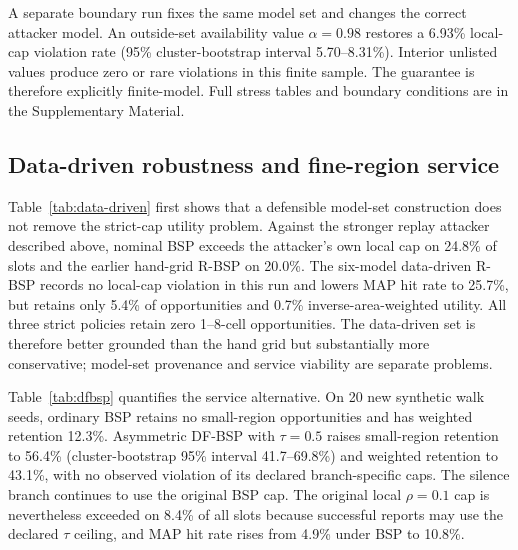 \documentclass[review,11pt,times]{elsarticle}
\begin{document}
A separate boundary run fixes the same model set and changes the correct attacker model. An outside-set availability value \(\alpha=0.98\) restores a 6.93\% local-cap violation rate (95\% cluster-bootstrap interval 5.70--8.31\%). Interior unlisted values produce zero or rare violations in this finite sample. The guarantee is therefore explicitly finite-model. Full stress tables and boundary conditions are in the Supplementary Material.

\subsection{Data-driven robustness and fine-region service}
\label{sec:data-driven-results}
Table~\ref{tab:data-driven} first shows that a defensible model-set construction does not remove the strict-cap utility problem. Against the stronger replay attacker described above, nominal BSP exceeds the attacker's own local cap on 24.8\% of slots and the earlier hand-grid R-BSP on 20.0\%. The six-model data-driven R-BSP records no local-cap violation in this run and lowers MAP hit rate to 25.7\%, but retains only 5.4\% of opportunities and 0.7\% inverse-area-weighted utility. All three strict policies retain zero 1--8-cell opportunities. The data-driven set is therefore better grounded than the hand grid but substantially more conservative; model-set provenance and service viability are separate problems.

\begin{table}[tbp]
\centering
\caption{Post-hoc GeoLife data-driven robustness at $\rho=0.1$. The replay attacker uses the development-only smoothed population prior and validation point mobility estimate. ``Local viol.'' tests the attacker's pre-output local cap. Weighted retention is Eq.~\eqref{eq:weighted-utility}; small retention covers 1--8-cell opportunities.}
\label{tab:data-driven}{\scriptsize\setlength{\tabcolsep}{3pt}}
\end{table}

Table~\ref{tab:dfbsp} quantifies the service alternative. On 20 new synthetic walk seeds, ordinary BSP retains no small-region opportunities and has weighted retention 12.3\%. Asymmetric DF-BSP with $\tau=0.5$ raises small-region retention to 56.4\% (cluster-bootstrap 95\% interval 41.7--69.8\%) and weighted retention to 43.1\%, with no observed violation of its declared branch-specific caps. The silence branch continues to use the original BSP cap. The original local $\rho=0.1$ cap is nevertheless exceeded on 8.4\% of all slots because successful reports may use the declared $\tau$ ceiling, and MAP hit rate rises from 4.9\% under BSP to 10.8\%.
\end{document}
